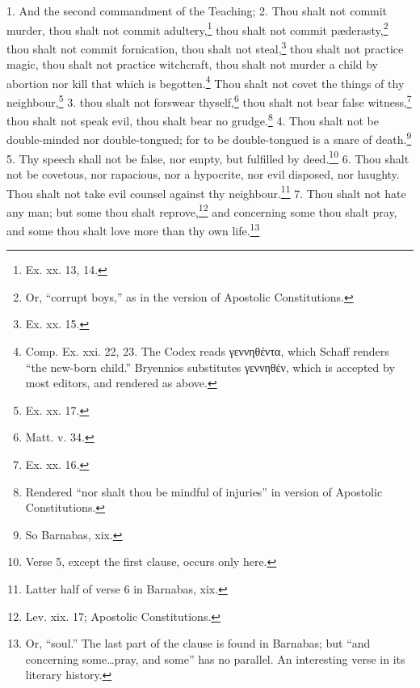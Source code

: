 1. And the second commandment of the Teaching; 2. Thou shalt not commit murder, thou shalt not commit adultery,\footnote{\par  Ex. xx. 13, 14.} thou shalt not commit pæderasty,\footnote{\par  Or, “corrupt boys,” as in the version of Apostolic Constitutions.} thou shalt not commit fornication, thou shalt not steal,\footnote{\par  Ex. xx. 15.} thou shalt not practice magic, thou shalt not practice witchcraft, thou shalt not murder a child by abortion nor kill that which is begotten.\footnote{\par  Comp. Ex. xxi. 22, 23. The Codex reads \textgreek{γεννηθέντα}, which Schaff renders “the new-born child.” Bryennios substitutes \textgreek{γεννηθέν}, which is accepted by most editors, and rendered as above.} Thou shalt not covet the things of thy neighbour,\footnote{\par  Ex. xx. 17.} 3. thou shalt not forswear thyself,\footnote{\par  Matt. v. 34.} thou shalt not bear false witness,\footnote{\par  Ex. xx. 16.} thou shalt not speak evil, thou shalt bear no grudge.\footnote{\par  Rendered “nor shalt thou be mindful of injuries” in version of Apostolic Constitutions.} 4. Thou shalt not be double-minded nor double-tongued; for to be double-tongued is a  snare of death.\footnote{\par  So Barnabas, xix.} 5. Thy speech shall not be false, nor empty, but fulfilled by deed.\footnote{\par  Verse 5, except the first clause, occurs only here.} 6. Thou shalt not be covetous, nor rapacious, nor a hypocrite, nor evil disposed, nor haughty. Thou shalt not take evil counsel against thy neighbour.\footnote{\par  Latter half of verse 6 in Barnabas, xix.} 7. Thou shalt not hate any man; but some thou shalt reprove,\footnote{\par  Lev. xix. 17; Apostolic Constitutions.} and concerning some thou shalt pray, and some thou shalt love more than thy own life.\footnote{\par  Or, “soul.” The last part of the clause is found in Barnabas; but “and concerning some…pray, and some” has no parallel. An interesting verse in its literary history.}


